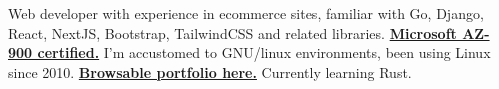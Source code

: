 


\begin{cvpubs}

  \cvpub
    {
      \begin{cvlist}
  \item { Web developer with experience in ecommerce sites, familiar with Go, Django, React, NextJS, Bootstrap, TailwindCSS and related libraries. \textbf{\href{https://www.credly.com/badges/17608a52-2cb7-4268-a907-613459559911/public_url}{Microsoft AZ-900 certified.}} I'm accustomed to GNU/linux environments, been using Linux since 2010. \textbf{\href{https://eduardozepeda.dev/\#portfolio}{Browsable portfolio here.}}} Currently learning Rust. 
      \end{cvlist}
    }\vspace{-15pt}
\end{cvpubs}

